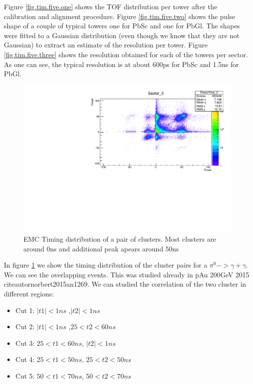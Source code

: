 \documentclass{article}
\begin{document}
Figure \ref{fig.tim.five.one} shows the TOF distribution per tower after the calibration and alignment procedure.
Figure \ref{fig.tim.five.two} shows the pulse shape of a couple of typical towers one for PbSc and one for PbGl. The shapes were fitted to a Gaussian distribution (even though we know that they are not Gaussian) to extract an estimate of the resolution per tower.
Figure \ref{fig.tim.five.three} shows the resolution obtained for each of the towers per sector. As one can see, the typical resolution is at about 600ps for PbSc and 1.5ns for PbGl.
\begin{figure}
\includegraphics[width=\textwidth]{fig_pi0vn/clustert1_clustert2_sect2.pdf}
\caption{EMC Timing distribution of a pair of clusters. Most clusters are around 0ns and additional peak apears around 50ns}
\label{cluster1vscluster2}
\end{figure}
In figure \ref{cluster1vscluster2} we show the timing distribution of the cluster pairs for a $\pi^0->\gamma+\gamma$. We can see the overlapping events. This was studied already in pAu 200GeV 2015 citeautor{norbert2015an1269}.
We can studied the correlation of the two cluster in different regions:
\begin{itemize}
\item{Cut 1: $|t1|<1 ns$ ,$|t2|<1 ns$}
\item{Cut 2: $|t1|<1 ns$ ,$25 <t2<60 ns$}
\item{Cut 3: $25 <t1<60 ns$, $|t2|<1 ns$}
\item{Cut 4: $25 <t1<50 ns$, $25<t2<50 ns$}
\item{Cut 5: $50 <t1<70 ns$, $50<t2<70 ns$}
\end{itemize}
\end{document}
